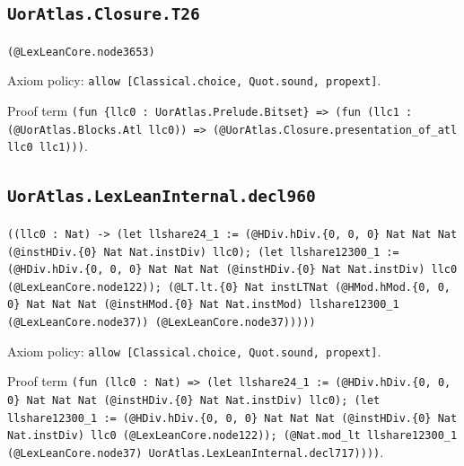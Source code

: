 \documentclass[11pt]{article}
\begin{document}
\subsection*{\texttt{UorAtlas.Closure.T26}}
\noindent\texttt{(@LexLeanCore.node3653)}\par
\noindent Axiom policy: \texttt{allow [Classical.choice, Quot.sound, propext]}.\par
\noindent Proof term \texttt{(fun \{llc0 : UorAtlas.Prelude.Bitset\} => (fun (llc1 : (@UorAtlas.Blocks.Atl llc0)) => (@UorAtlas.Closure.presentation\_of\_atl llc0 llc1)))}.\par
\subsection*{\texttt{UorAtlas.LexLeanInternal.decl960}}
\noindent\texttt{((llc0 : Nat) -> (let llshare24\_1 := (@HDiv.hDiv.\{0, 0, 0\} Nat Nat Nat (@instHDiv.\{0\} Nat Nat.instDiv) llc0); (let llshare12300\_1 := (@HDiv.hDiv.\{0, 0, 0\} Nat Nat Nat (@instHDiv.\{0\} Nat Nat.instDiv) llc0 (@LexLeanCore.node122)); (@LT.lt.\{0\} Nat instLTNat (@HMod.hMod.\{0, 0, 0\} Nat Nat Nat (@instHMod.\{0\} Nat Nat.instMod) llshare12300\_1 (@LexLeanCore.node37)) (@LexLeanCore.node37)))))}\par
\noindent Axiom policy: \texttt{allow [Classical.choice, Quot.sound, propext]}.\par
\noindent Proof term \texttt{(fun (llc0 : Nat) => (let llshare24\_1 := (@HDiv.hDiv.\{0, 0, 0\} Nat Nat Nat (@instHDiv.\{0\} Nat Nat.instDiv) llc0); (let llshare12300\_1 := (@HDiv.hDiv.\{0, 0, 0\} Nat Nat Nat (@instHDiv.\{0\} Nat Nat.instDiv) llc0 (@LexLeanCore.node122)); (@Nat.mod\_lt llshare12300\_1 (@LexLeanCore.node37) UorAtlas.LexLeanInternal.decl717))))}.\par
\end{document}
